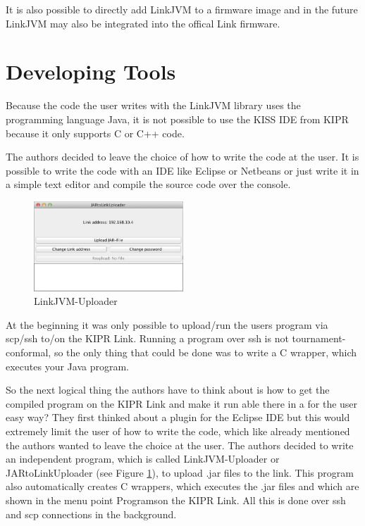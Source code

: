 \documentclass{juniorjournal}
\begin{document}
It is also possible to directly add LinkJVM to a firmware image and in the future LinkJVM may also be integrated into the offical Link firmware.
\section{Developing Tools}
Because the code the user writes with the LinkJVM library uses the programming 
language Java\cite{Java}, it is not possible to use the KISS IDE from KIPR\cite{KIPR} because it only 
supports C or C++ code.

The authors decided to leave the choice of how to write the code at the user. It 
is possible to write the code with an IDE like Eclipse or Netbeans or just write 
it in a simple text editor and compile the source code over the console.

\begin{figure}[H]
\centering
\includegraphics[width=0.5\textwidth]{images/linkjvm_uploader.jpg}
\caption{LinkJVM-Uploader}
\label{fig:linkjvm_uploader}
\end{figure}

At the beginning it was only possible to upload/run the users program via scp/ssh to/on the KIPR\cite{KIPR} Link.
Running a program over ssh is not tournament-conformal, so the only thing that could be done 
was to write a C wrapper, which executes your Java\cite{Java} program.

So the next logical thing the authors have to think about is how to get the compiled 
program on the KIPR\cite{KIPR} Link and make it run able there in a for the user easy way?
They first thinked about a plugin for the Eclipse IDE but this would extremely 
limit the user of how to write the code, which like already mentioned the 
authors wanted to leave the choice at the user.
The authors decided to write an independent program, which is called 
LinkJVM-Uploader or JARtoLinkUploader (see Figure \ref{fig:linkjvm_uploader}), 
to upload .jar files to the link. This program also automatically creates C 
wrappers, which executes the .jar files and which are shown in the menu point 
\frqq Programs\flqq  on the KIPR\cite{KIPR} Link. All this is done over ssh and scp connections in 
the background.
\end{document}
